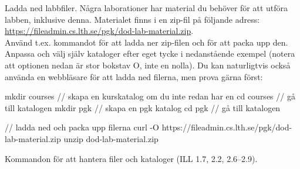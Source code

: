 \begin{Datorarbete}
	\item Ladda ned labbfiler. Några laborationer har material du behöver för att utföra labben, inklusive denna. Materialet finns i en zip-fil på följande adress:\\
	\url{https://fileadmin.cs.lth.se/pgk/dod-lab-material.zip}.\\
	Använd t.ex. kommandot  för att ladda ner zip-filen och  för att packa upp den. Anpassa och välj själv kataloger efter eget tycke i nedanstående exempel (notera att optionen  nedan är stor bokstav O, inte en nolla). Du kan naturligtvis också använda en webbläsare för att ladda ned filerna, men prova gärna  först:

	\begin{Code}
		mkdir courses    // skapa en kurskatalog om du inte redan har en
		cd courses       // gå till katalogen
		mkdir pgk        // skapa en pgk katalog
		cd pgk           // gå till katalogen

		// ladda ned och packa upp filerna
		curl -O https://fileadmin.cs.lth.se/pgk/dod-lab-material.zip
		unzip dod-lab-material.zip
	\end{Code}

	\item Kommandon för att hantera filer och kataloger (ILL 1.7, 2.2, 2.6--2.9).


\end{Datorarbete}
